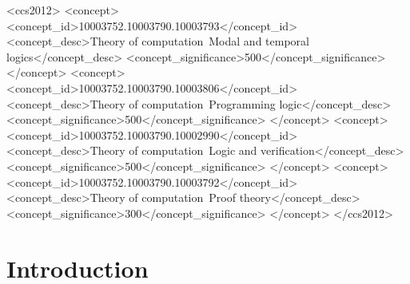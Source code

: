 \documentclass[manuscript,screen]{acmart}
\begin{document}
\begin{CCSXML}
<ccs2012>
   <concept>
       <concept_id>10003752.10003790.10003793</concept_id>
       <concept_desc>Theory of computation~Modal and temporal logics</concept_desc>
       <concept_significance>500</concept_significance>
       </concept>
   <concept>
       <concept_id>10003752.10003790.10003806</concept_id>
       <concept_desc>Theory of computation~Programming logic</concept_desc>
       <concept_significance>500</concept_significance>
       </concept>
   <concept>
       <concept_id>10003752.10003790.10002990</concept_id>
       <concept_desc>Theory of computation~Logic and verification</concept_desc>
       <concept_significance>500</concept_significance>
       </concept>
   <concept>
       <concept_id>10003752.10003790.10003792</concept_id>
       <concept_desc>Theory of computation~Proof theory</concept_desc>
       <concept_significance>300</concept_significance>
       </concept>
 </ccs2012>
\end{CCSXML}




\maketitle

\section{Introduction}
\label{section:Introduction}
\end{document}

